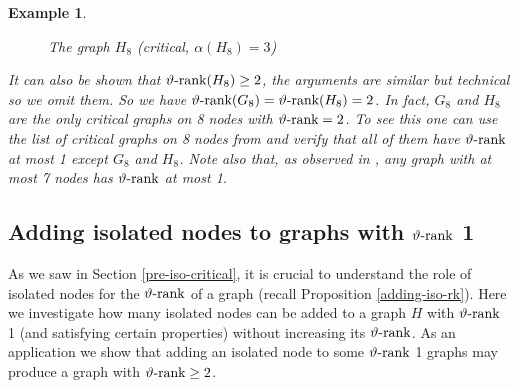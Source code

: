 \documentclass[11pt]{article}
\newtheorem{example}[theorem]{Example}
\numberwithin{equation}{section}
\newcommand{\rrank}{\vartheta\text{\rm -rank}}
\begin{document}
\begin{example}
\begin{figure}[H]
\begin{minipage}{0.5\linewidth}
\begin{center}
\caption{The graph $H_8$ (critical, $\alpha(H_8)=3$)}
\end{center}
\end{minipage}
\end{figure}
It can also be shown that $\rrank(H_8)\geq 2$, the arguments are similar but technical so we omit them.
So we have $\rrank(G_8)=\rrank(H_8)=2$.   In fact,  $G_8$ and $H_8$ are the {\em only} critical graphs on  8 nodes with $\rrank=2$. 
To see this one can use the list of critical graphs on 8 nodes from \cite{Small} and verify that all of them have $\rrank$ at most 1 except $G_8$ and $H_8$. Note also that,  as observed in \cite{PVZ2007}, any  graph with at most 7 nodes has $\rrank$ at most 1. 
\end{example}

\subsection{Adding isolated nodes to graphs with $\rrank$ 1}\label{sec-isolated}

As we saw in  Section \ref{pre-iso-critical}, it is crucial to understand the role of isolated nodes for  the $\rrank$ of a graph (recall Proposition \ref{adding-iso-rk}).
Here we investigate  how  many isolated nodes can be added to a  graph $H$  with $\rrank$ 1 (and satisfying certain properties) without increasing its $\rrank$. As an application we show that adding an isolated node to some $\rrank$ 1 graphs may produce a graph with $\rrank \ge 2$. 
\end{document}
